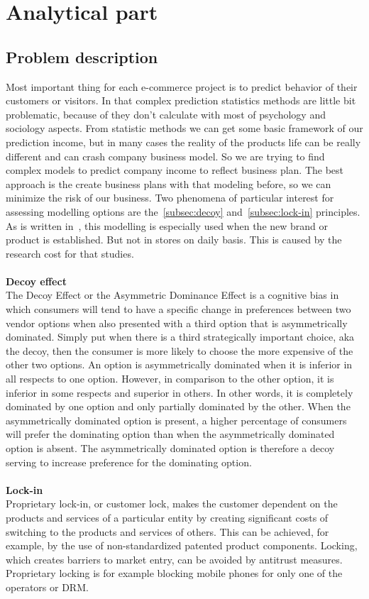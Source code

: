 
\chapter{Analytical part}
\label{sec:analytical}
\section{Problem description} \label{sec:description}
Most important thing for each e-commerce project is to predict behavior of their customers or visitors.
In that complex prediction statistics methods are little bit problematic, because of they don't calculate with most of psychology
and sociology aspects.
From statistic methods we can get some basic framework of our prediction income, but in many cases the reality
of the products life can be really different and can crash company business model.
So we are trying to find complex models to predict company income to reflect business plan.
The best approach is the create business plans with that modeling before, so we can minimize the risk of our business.
Two phenomena of particular interest for assessing modelling options are the~\ref{subsec:decoy} and~\ref{subsec:lock-in} principles.
As is written in~\cite{patel}, this modelling is especially used when  the new brand or product is established.
But not in stores on daily basis.
This is caused by the research cost for that studies.\\
\\
\textbf{Decoy effect} \label{subsec:decoy}\\
The Decoy Effect or the Asymmetric Dominance Effect is a cognitive bias in which consumers will tend to have a specific
change in preferences between two vendor options when also presented with a third option that is asymmetrically dominated.
Simply put when there is a third strategically important choice, aka the decoy, then the consumer is more likely to
choose the more expensive of the other two options.
An option is asymmetrically dominated when it is inferior in all respects to one option.
However, in comparison to the other option, it is inferior in some respects and superior in others.
In other words, it is completely dominated by one option and only partially dominated by the other.
When the asymmetrically dominated option is present, a higher percentage of consumers will prefer the dominating
option than when the asymmetrically dominated option is absent.
The asymmetrically dominated option is therefore a decoy serving to increase preference for the dominating option.\\
\\
\textbf{Lock-in} \label{subsec:lock-in}\\
Proprietary lock-in, or customer lock, makes the customer dependent on the products and services of a particular
entity by creating significant costs of switching to the products and services of others.
This can be achieved, for example, by the use of non-standardized patented product components.
Locking, which creates barriers to market entry, can be avoided by antitrust measures.
Proprietary locking is for example blocking mobile phones for only one of the operators or DRM.

